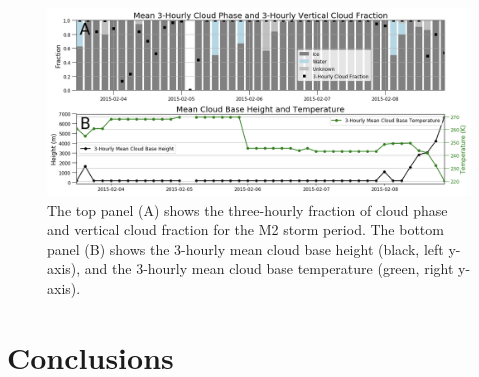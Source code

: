 \begin{figure}[H]
    \centering
    \includegraphics[width=1\linewidth]{figures/chapter4/ch2_f11.png}
    \caption[Cloud phase, fraction, base height, and base temperature.]{The top panel (A) shows the three-hourly fraction of cloud phase and vertical cloud fraction for the M2 storm period. The bottom panel (B) shows the 3-hourly mean cloud base height (black, left y-axis), and the 3-hourly mean cloud base temperature (green, right y-axis).}
    \label{fig:clouds}
\end{figure}

\section{Conclusions}